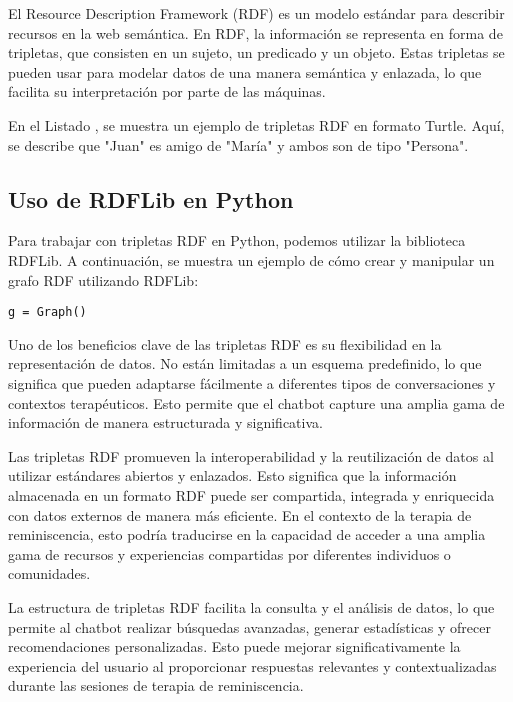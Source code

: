 El Resource Description Framework (RDF) es un modelo estándar para describir recursos en la web semántica. En RDF, la información se representa en forma de tripletas, que consisten en un sujeto, un predicado y un objeto. Estas tripletas se pueden usar para modelar datos de una manera semántica y enlazada, lo que facilita su interpretación por parte de las máquinas.




En el Listado , se muestra un ejemplo de tripletas RDF en formato Turtle. Aquí, se describe que "Juan" es amigo de "María" y ambos son de tipo "Persona".

\subsection{Uso de RDFLib en Python}

Para trabajar con tripletas RDF en Python, podemos utilizar la biblioteca RDFLib. A continuación, se muestra un ejemplo de cómo crear y manipular un grafo RDF utilizando RDFLib:



\begin{lstlisting}[frame=tb]
g = Graph()
 \end{lstlisting}

Uno de los beneficios clave de las tripletas RDF es su flexibilidad en la representación de datos. No están limitadas a un esquema predefinido, lo que significa que pueden adaptarse fácilmente a diferentes tipos de conversaciones y contextos terapéuticos. Esto permite que el chatbot capture una amplia gama de información de manera estructurada y significativa.
	
Las tripletas RDF promueven la interoperabilidad y la reutilización de datos al utilizar estándares abiertos y enlazados. Esto significa que la información almacenada en un formato RDF puede ser compartida, integrada y enriquecida con datos externos de manera más eficiente. En el contexto de la terapia de reminiscencia, esto podría traducirse en la capacidad de acceder a una amplia gama de recursos y experiencias compartidas por diferentes individuos o comunidades.
	
La estructura de tripletas RDF facilita la consulta y el análisis de datos, lo que permite al chatbot realizar búsquedas avanzadas, generar estadísticas y ofrecer recomendaciones personalizadas. Esto puede mejorar significativamente la experiencia del usuario al proporcionar respuestas relevantes y contextualizadas durante las sesiones de terapia de reminiscencia.

